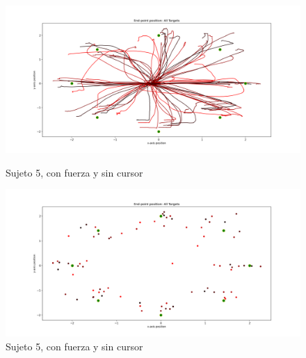 \documentclass[a4paper,11pt, oneside]{book}
\begin{document}
\begin{figure}[H]
	\begin{minipage}[b]{0.5\linewidth}
		\centering
		\includegraphics[width=\linewidth]{sujeto5/force_no_cursor/trayectorias}
		\caption{Sujeto 5, con fuerza y sin cursor}
		\label{5-fase4-1}
	\end{minipage}
	\hspace{0.5cm}
	\begin{minipage}[b]{0.5\linewidth}
		\centering
		\includegraphics[width=\linewidth]{sujeto5/force_no_cursor/trayectorias_puntos}
		\caption{Sujeto 5, con fuerza y sin cursor}
		\label{5-fase4-2}
	\end{minipage}
\end{figure}
\end{document}
